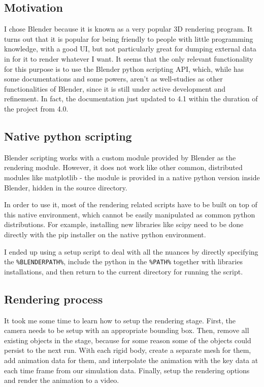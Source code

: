 \documentclass[12pt,a4paper,twoside,openright]{report}
\newcommand{\code}{\texttt}
\begin{document}
\subsection{Motivation}

I chose Blender because it is known as a very popular 3D rendering program. It turns out that it is popular for being friendly to people with little programming knowledge, with a good UI, but not particularly great for dumping external data in for it to render whatever I want. It seems that the only relevant functionality for this purpose is to use the Blender python scripting API, which, while has some documentations and some powers, aren't as well-studies as other functionalities of Blender, since it is still under active development and refinement. In fact, the documentation just updated to 4.1\cite{blenderdoc} within the duration of the project from 4.0.

\subsection{Native python scripting}

Blender scripting works with a custom module provided by Blender as the rendering module. However, it does not work like other common, distributed modules like matplotlib - the module is provided in a native python version inside Blender, hidden in the source directory.

In order to use it, most of the rendering related scripts have to be built on top of this native environment, which cannot be easily manipulated as common python distributions. For example, installing new libraries like scipy need to be done directly with the pip installer on the native python environment.

I ended up using a setup script to deal with all the nuances by directly specifying the \code{\%BLENDERPATH\%}, include the python in the \code{\%PATH\%} together with libraries installations, and then return to the current directory for running the script.

\subsection{Rendering process}

It took me some time to learn how to setup the rendering stage. First, the camera needs to be setup with an appropriate bounding box. Then, remove all existing objects in the stage, because for some reason some of the objects could persist to the next run. With each rigid body, create a separate mesh for them, add animation data for them, and interpolate the animation with the key data at each time frame from our simulation data. Finally, setup the rendering options and render the animation to a video.
\end{document}
